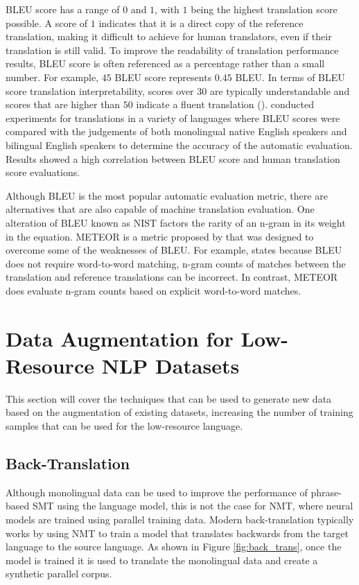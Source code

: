 \acrshort{BLEU} score has a range of $0$ and $1$, with $1$ being the highest translation score possible. A score of $1$ indicates that it is a direct copy of the reference translation, making it difficult to achieve for human translators, even if their translation is still valid. To improve the readability of translation performance results, \acrshort{BLEU} score is often referenced as a percentage rather than a small number. For example, $45$ \acrshort{BLEU} score represents $0.45$ \acrshort{BLEU}. In terms of \acrshort{BLEU} score translation interpretability, scores over $30$ are typically understandable and scores that are higher than $50$ indicate a fluent translation (\cite{lavie_evaluating_2010}).
\cite{papineni_bleu_2001} conducted experiments for translations in a variety of languages where \acrshort{BLEU} scores were compared with the judgements of both monolingual native English speakers and bilingual English speakers to determine the accuracy of the automatic evaluation. Results showed a high correlation between \acrshort{BLEU} score and human translation score evaluations.

Although \acrshort{BLEU} is the most popular automatic evaluation metric, there are alternatives that are also capable of machine translation evaluation. One alteration of \acrshort{BLEU} known as \acrfull{NIST} factors the rarity of an n-gram in its weight in the equation. \acrfull{METEOR} is a metric proposed by \cite{banerjee_meteor_2005} that was designed to overcome some of the weaknesses of \acrshort{BLEU}. For example, \cite{banerjee_meteor_2005} states because \acrshort{BLEU} does not require word-to-word matching, n-gram counts of matches between the translation and reference translations can be incorrect. In contrast, \acrshort{METEOR} does evaluate n-gram counts based on explicit word-to-word matches. 

\section{Data Augmentation for Low-Resource NLP Datasets}
\label{sec:2-low_resource_mt}

This section will cover the techniques that can be used to generate new data based on the augmentation of existing datasets, increasing the number of training samples that can be used for the low-resource language.

\subsection{Back-Translation}
Although monolingual data can be used to improve the performance of phrase-based \acrfull{SMT} using the language model, this is not the case for \acrshort{NMT}, where neural models are trained using parallel training data. Modern back-translation typically works by using \acrshort{NMT} to train a model that translates backwards from the target language to the source language. As shown in Figure \ref{fig:back_trans}, once the model is trained it is used to translate the monolingual data and create a synthetic parallel corpus.


